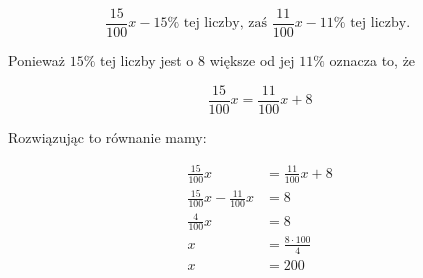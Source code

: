 \documentclass[10pt]{article}
\begin{document}
\[
\frac{15}{100} x-15 \% \text { tej liczby, zaś } \frac{11}{100} x-11 \% \text { tej liczby. }
\]

Ponieważ \(15 \%\) tej liczby jest o 8 większe od jej \(11 \%\) oznacza to, że

\[
\frac{15}{100} x=\frac{11}{100} x+8
\]

Rozwiązując to równanie mamy:

\[
\begin{aligned}
\frac{15}{100} x & =\frac{11}{100} x+8 \\
\frac{15}{100} x-\frac{11}{100} x & =8 \\
\frac{4}{100} x & =8 \\
x & =\frac{8 \cdot 100}{4} \\
x & =200
\end{aligned}
\]
\end{document}
